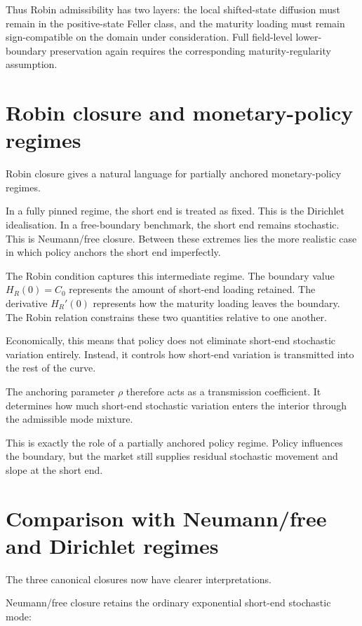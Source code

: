 \documentclass[11pt,oneside]{book}
\begin{document}
Thus Robin admissibility has two layers: the local shifted-state
diffusion must remain in the positive-state Feller class, and the
maturity loading must remain sign-compatible on the domain under
consideration. Full field-level lower-boundary preservation again
requires the corresponding maturity-regularity assumption.

\section{Robin closure and monetary-policy
regimes}\label{robin-closure-and-monetary-policy-regimes}

Robin closure gives a natural language for partially anchored
monetary-policy regimes.

In a fully pinned regime, the short end is treated as fixed. This is the
Dirichlet idealisation. In a free-boundary benchmark, the short end
remains stochastic. This is Neumann/free closure. Between these extremes
lies the more realistic case in which policy anchors the short end
imperfectly.

The Robin condition captures this intermediate regime. The boundary
value $H_R(0)=C_0$ represents the amount of short-end loading retained.
The derivative $H_R'(0)$ represents how the maturity loading leaves the
boundary. The Robin relation constrains these two quantities relative to
one another.

Economically, this means that policy does not eliminate short-end
stochastic variation entirely. Instead, it controls how short-end
variation is transmitted into the rest of the curve.

The anchoring parameter $\rho$ therefore acts as a transmission coefficient.
It determines how much short-end stochastic variation enters the
interior through the admissible mode mixture.

This is exactly the role of a partially anchored policy regime. Policy
influences the boundary, but the market still supplies residual
stochastic movement and slope at the short end.

\section{Comparison with Neumann/free and Dirichlet
regimes}\label{comparison-with-natural-and-dirichlet-regimes}

The three canonical closures now have clearer interpretations.

Neumann/free closure retains the ordinary exponential short-end
stochastic mode:
\end{document}
